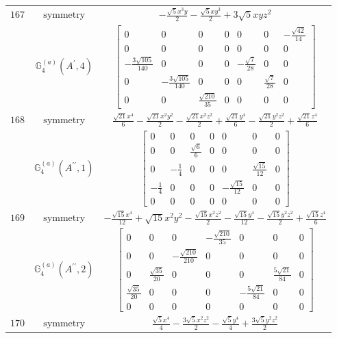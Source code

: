 \documentclass[fleqn,8pt,landscape]{jsarticle}
\begin{document}
\begin{longtable}{ccc}
$ 167 $ & $ \text{symmetry} $ & $ - \frac{\sqrt{5} x^{3} y}{2} - \frac{\sqrt{5} x y^{3}}{2} + 3 \sqrt{5} x y z^{2} $ \\
$  $ & $ \mathbb{G}_{4}^{(a)}(A^{\prime},4) $ & $ \begin{bmatrix} 0 & 0 & 0 & 0 & 0 & 0 & - \frac{\sqrt{42}}{14} \\ 0 & 0 & 0 & 0 & 0 & 0 & 0 \\ - \frac{3 \sqrt{105}}{140} & 0 & 0 & 0 & - \frac{\sqrt{7}}{28} & 0 & 0 \\ 0 & - \frac{3 \sqrt{105}}{140} & 0 & 0 & 0 & \frac{\sqrt{7}}{28} & 0 \\ 0 & 0 & \frac{\sqrt{210}}{35} & 0 & 0 & 0 & 0 \end{bmatrix} $ \\ \hline
$ 168 $ & $ \text{symmetry} $ & $ \frac{\sqrt{21} x^{4}}{6} - \frac{\sqrt{21} x^{2} y^{2}}{2} - \frac{\sqrt{21} x^{2} z^{2}}{2} + \frac{\sqrt{21} y^{4}}{6} - \frac{\sqrt{21} y^{2} z^{2}}{2} + \frac{\sqrt{21} z^{4}}{6} $ \\
$  $ & $ \mathbb{G}_{4}^{(a)}(A^{\prime\prime},1) $ & $ \begin{bmatrix} 0 & 0 & 0 & 0 & 0 & 0 & 0 \\ 0 & 0 & \frac{\sqrt{6}}{6} & 0 & 0 & 0 & 0 \\ 0 & - \frac{1}{4} & 0 & 0 & 0 & \frac{\sqrt{15}}{12} & 0 \\ - \frac{1}{4} & 0 & 0 & 0 & - \frac{\sqrt{15}}{12} & 0 & 0 \\ 0 & 0 & 0 & 0 & 0 & 0 & 0 \end{bmatrix} $ \\ \hline
$ 169 $ & $ \text{symmetry} $ & $ - \frac{\sqrt{15} x^{4}}{12} + \sqrt{15} x^{2} y^{2} - \frac{\sqrt{15} x^{2} z^{2}}{2} - \frac{\sqrt{15} y^{4}}{12} - \frac{\sqrt{15} y^{2} z^{2}}{2} + \frac{\sqrt{15} z^{4}}{6} $ \\
$  $ & $ \mathbb{G}_{4}^{(a)}(A^{\prime\prime},2) $ & $ \begin{bmatrix} 0 & 0 & 0 & - \frac{\sqrt{210}}{35} & 0 & 0 & 0 \\ 0 & 0 & - \frac{\sqrt{210}}{210} & 0 & 0 & 0 & 0 \\ 0 & \frac{\sqrt{35}}{20} & 0 & 0 & 0 & \frac{5 \sqrt{21}}{84} & 0 \\ \frac{\sqrt{35}}{20} & 0 & 0 & 0 & - \frac{5 \sqrt{21}}{84} & 0 & 0 \\ 0 & 0 & 0 & 0 & 0 & 0 & 0 \end{bmatrix} $ \\ \hline
$ 170 $ & $ \text{symmetry} $ & $ \frac{\sqrt{5} x^{4}}{4} - \frac{3 \sqrt{5} x^{2} z^{2}}{2} - \frac{\sqrt{5} y^{4}}{4} + \frac{3 \sqrt{5} y^{2} z^{2}}{2} $ \\

\end{longtable}
\end{document}
